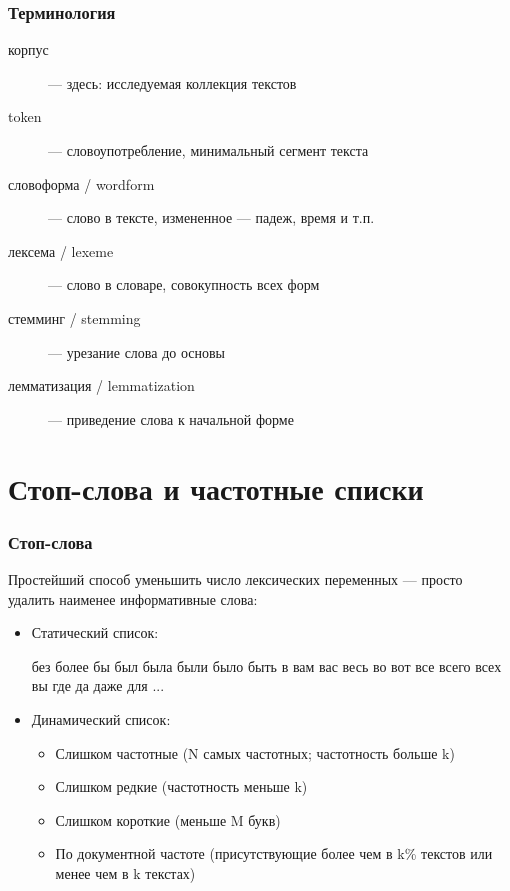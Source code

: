 \documentclass[svgnames]{beamer}
\begin{document}
\begin{frame}
  \frametitle{Терминология}
  \begin{description}
  \item[корпус] — здесь: исследуемая коллекция текстов
  \item[token] — словоупотребление, минимальный сегмент текста
  \item[словоформа / wordform] — слово в тексте, измененное — падеж, время и т.п.
  \item[лексема / lexeme] — слово в словаре, совокупность всех форм
  \item[стемминг / stemming] — урезание слова до основы
  \item[лемматизация / lemmatization] — приведение слова к начальной форме
  \end{description}
\end{frame}

\section{Стоп-слова и частотные списки}

\begin{frame}
  \frametitle{Стоп-слова} Простейший способ уменьшить число
  лексических переменных — просто удалить \alert{наименее информативные} слова:

  \begin{itemize}
  \item Статический список:

без
более
бы
был
была
были
было
быть
в
вам
вас
весь
во
вот
все
всего
всех
вы
где
да
даже
для ...

  \item Динамический список:

    \begin{itemize}
    \item Слишком частотные (N самых частотных; частотность больше k)
    \item Слишком редкие (частотность меньше k)
    \item Слишком короткие (меньше M букв)
    \item По документной частоте (присутствующие более чем в k\%
      текстов или менее чем в k текстах)
    \end{itemize}
  \end{itemize}
\end{frame}
\end{document}
